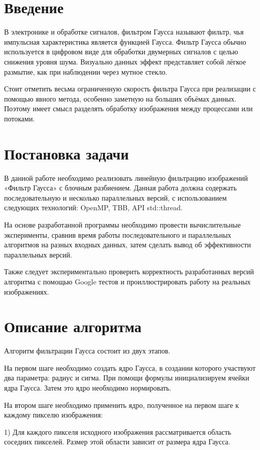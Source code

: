 \documentclass{report}
\begin{document}
\setcounter{page}{2}

\section*{Введение}
В электронике и обработке сигналов, фильтром Гаусса называют фильтр, чья импульсная характеристика является функцией Гаусса. Фильтр Гаусса обычно используется в цифровом виде для обработки двумерных сигналов с целью снижения уровня шума. Визуально данных эффект представляет собой лёгкое размытие, как при наблюдении через мутное стекло. 
\par
Стоит отметить весьма ограниченную скорость фильтра Гаусса при реализации с помощью явного метода, особенно заметную на больших объёмах данных. Поэтому имеет смысл разделять обработку изображения между процессами или потоками.
\newpage

\section*{Постановка задачи}
В данной работе необходимо реализовать линейную фильтрацию изображений «Фильтр Гаусса» с блочным разбиением. Данная работа должна содержать последовательную и несколько параллельных версий, с использованием следующих технологий: OpenMP, TBB, API std::thread. 
\par
На основе разработанной программы необходимо провести вычислительные эксперименты, сравнив время работы последовательного и параллельных алгоритмов на разных входных данных, затем сделать вывод об эффективности параллельных версий.
\par
Также следует экспериментально проверить корректность разработанных версий алгоритма с помощью Google тестов и проиллюстрировать работу на реальных изображениях.
\newpage

\section*{Описание алгоритма}
Алгоритм фильтрации Гаусса состоит из двух этапов.
\par
На первом шаге необходимо создать ядро Гаусса, в создании которого участвуют два параметра: радиус и сигма. При помощи формулы инициализируем ячейки ядра Гаусса. Затем это ядро необходимо нормировать.
\par
На втором шаге необходимо применить ядро, полученное на первом шаге к каждому пикселю изображения:
\par
    1) Для каждого пикселя исходного изображения рассматривается область соседних пикселей. Размер этой области зависит от размера ядра Гаусса.
\par 
\end{document}
